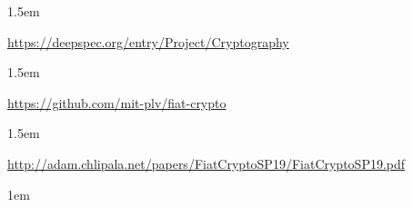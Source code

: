 \documentclass[12pt,twoside]{article}
\begin{document}
\begin{mddefinitions}%


\begin{mdbmarginx}{}{}{}{1.5em}%
\begin{mddefdata}%
\href{https://deepspec.org/entry/Project/Cryptography}{{\ttfamily https://\hspace{0pt}deepspec.\hspace{0pt}org/\hspace{0pt}entry/\hspace{0pt}Project/\hspace{0pt}Cryptography}}
\end{mddefdata}%
\end{mdbmarginx}%


\begin{mdbmarginx}{}{}{}{1.5em}%
\begin{mddefdata}%
\href{https://github.com/mit-plv/fiat-crypto}{{\ttfamily https://\hspace{0pt}github.\hspace{0pt}com/\hspace{0pt}mit-\hspace{0pt}plv/\hspace{0pt}fiat-\hspace{0pt}crypto}}
\end{mddefdata}%
\end{mdbmarginx}%


\begin{mdbmarginx}{}{}{}{1.5em}%
\begin{mddefdata}%
\href{http://adam.chlipala.net/papers/FiatCryptoSP19/FiatCryptoSP19.pdf}{{\ttfamily http://\hspace{0pt}adam.\hspace{0pt}chlipala.\hspace{0pt}net/\hspace{0pt}papers/\hspace{0pt}FiatCryptoSP19/\hspace{0pt}FiatCryptoSP19.\hspace{0pt}pdf}}
\begin{mdpre}%
\begin{mdbmarginx}{}{}{}{1em}%
\end{mdbmarginx}%
\end{mdpre}%
\end{mddefdata}%
\end{mdbmarginx}%
\end{mddefinitions}%
\end{document}
